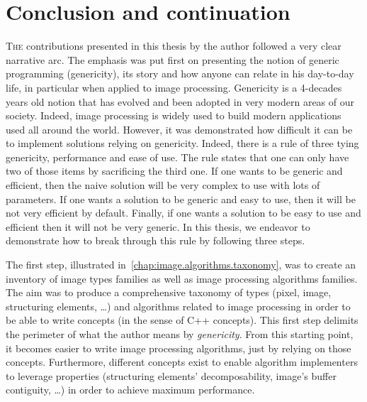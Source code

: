 \chapter{Conclusion and continuation}
\label{chap:conclusion}

\lettrine[lines=2]{T}{he} contributions presented in this thesis by the author followed a very clear narrative arc. The
emphasis was put first on presenting the notion of generic programming (genericity), its story and how anyone can relate
in his day-to-day life, in particular when applied to image processing. Genericity is a 4-decades years old notion that
has evolved and been adopted in very modern areas of our society. Indeed, image processing is widely used to build
modern applications used all around the world. However, it was demonstrated how difficult it can be to implement
solutions relying on genericity. Indeed, there is a rule of three tying genericity, performance and ease of use. The
rule states that one can only have two of those items by sacrificing the third one. If one wants to be generic and
efficient, then the naive solution will be very complex to use with lots of parameters. If one wants a solution to be
generic and easy to use, then it will be not very efficient by default. Finally, if one wants a solution to be easy to
use and efficient then it will not be very generic. In this thesis, we endeavor to demonstrate how to break through this
rule by following three steps.

The first step, illustrated in~\cref{chap:image.algorithms.taxonomy}, was to create an inventory of image types families
as well as image processing algorithms families. The aim was to produce a comprehensive taxonomy of types (pixel, image,
structuring elements, \ldots) and algorithms related to image processing in order to be able to write concepts (in the
sense of C++ concepts). This first step delimits the perimeter of what the author means by \emph{genericity}. From this
starting point, it becomes easier to write image processing algorithms, just by relying on those concepts. Furthermore,
different concepts exist to enable algorithm implementers to leverage properties (structuring elements' decomposability,
image's buffer contiguity, \ldots) in order to achieve maximum performance.

